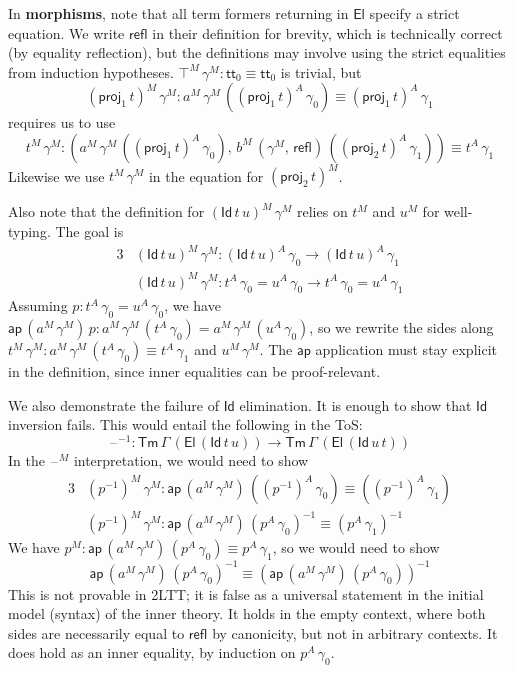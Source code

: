 \documentclass[12pt,a4paper,twoside,openany]{book}
\theoremstyle{remark}
\theoremstyle{definition}
\theoremstyle{theorem}
\newcommand{\ms}[1]{\mathsf{#1}}
\newcommand{\ap}{\ms{ap}}
\newcommand{\refl}{\mathsf{refl}}
\newcommand{\Tm}{\mathsf{Tm}}
\newcommand{\El}{\mathsf{El}}
\newcommand{\Id}{\mathsf{Id}}
\newcommand{\proj}{\mathsf{proj}}
\renewcommand{\tt}{\mathsf{tt}}
\newcommand{\blank}{\mathord{\hspace{1pt}\text{--}\hspace{1pt}}}
\begin{document}
In \textbf{morphisms}, note that all term formers returning in $\El$ specify a
strict equation. We write $\refl$ in their definition for brevity, which is
technically correct (by equality reflection), but the definitions may involve
using the strict equalities from induction hypotheses.  $\top^M\,\gamma^M :
\tt_0 \equiv \tt_0$ is trivial, but
\[  (\proj_1\,t)^M\,\gamma^M : a^M\,\gamma^M\,((\proj_1\,t)^A\,\gamma_0) \equiv (\proj_1\,t)^A\,\gamma_1\]
requires us to use
\[t^M\,\gamma^M : (a^M\,\gamma^M\,((\proj_1\,t)^A\,\gamma_0),\,b^M\,(\gamma^M,\,\refl)\,((\proj_2\,t)^A\,\gamma_1))
\equiv t^A\,\gamma_1 \]
Likewise we use $t^M\,\gamma^M$ in the equation for $(\proj_2\,t)^M$.

Also note that the definition for $(\Id\,t\,u)^M\,\gamma^M$ relies on $t^M$ and
$u^M$ for well-typing. The goal is
\begin{alignat*}{3}
  &(\Id\,t\,u)^M\,\gamma^M : (\Id\,t\,u)^A\,\gamma_0 \to (\Id\,t\,u)^A\,\gamma_1\\
  &(\Id\,t\,u)^M\,\gamma^M : t^A\,\gamma_0 = u^A\,\gamma_0 \to t^A\,\gamma_0 = u^A\,\gamma_1
\end{alignat*}
Assuming $p : t^A\,\gamma_0 = u^A\,\gamma_0$, we have $\ap\,(a^M\,\gamma^M)\,p :
a^M\,\gamma^M\,(t^A\,\gamma_0) = a^M\,\gamma^M\,(u^A\,\gamma_0)$, so we rewrite
the sides along $t^M\,\gamma^M : a^M\,\gamma^M\,(t^A\,\gamma_0) \equiv
t^A\,\gamma_1$ and $u^M\,\gamma^M$. The $\ap$ application must stay explicit in
the definition, since inner equalities can be proof-relevant.

We also demonstrate the failure of $\Id$ elimination. It is enough to show that
$\Id$ inversion fails. This would entail the following in the ToS:
\[
  \blank^{-1} : \Tm\,\Gamma\,(\El\,(\Id\,t\,u)) \to \Tm\,\Gamma\,(\El\,(\Id\,u\,t))
\]
In the $\blank^M$ interpretation, we would need to show
\begin{alignat*}{3}
  &(p^{-1})^M\,\gamma^M : \ap\,(a^M\,\gamma^M)\,((p^{-1})^A\,\gamma_0) \equiv ((p^{-1})^A\,\gamma_1)\\
  &(p^{-1})^M\,\gamma^M : \ap\,(a^M\,\gamma^M)\, (p^A\,\gamma_0)^{-1} \equiv (p^A\,\gamma_1)^{-1}
\end{alignat*}
We have $p^M : \ap\,(a^M\,\gamma^M)\,(p^A\,\gamma_0) \equiv p^A\,\gamma_1$,
so we would need to show
\[
  \ap\,(a^M\,\gamma^M)\, (p^A\,\gamma_0)^{-1} \equiv (\ap\,(a^M\,\gamma^M)\,(p^A\,\gamma_0))^{-1}
\]
This is not provable in 2LTT; it is false as a universal statement in the
initial model (syntax) of the inner theory. It holds in the empty context, where
both sides are necessarily equal to $\refl$ by canonicity, but not in arbitrary
contexts. It does hold as an inner equality, by induction on $p^A\,\gamma_0$.
\end{document}
